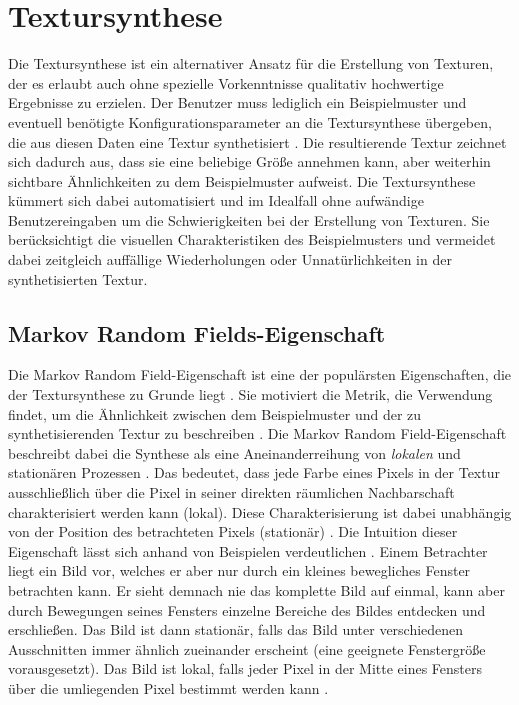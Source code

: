 \section{Textursynthese}

Die Textursynthese ist ein alternativer Ansatz für die Erstellung von Texturen, der es erlaubt auch ohne spezielle Vorkenntnisse qualitativ hochwertige Ergebnisse zu erzielen.
Der Benutzer muss lediglich ein Beispielmuster und eventuell benötigte Konfigurationsparameter an die Textursynthese übergeben, die aus diesen Daten eine Textur synthetisiert \cite{StateOfTheArt}.
Die resultierende Textur zeichnet sich dadurch aus, dass sie eine beliebige Größe annehmen kann, aber weiterhin sichtbare Ähnlichkeiten zu dem Beispielmuster aufweist.
Die Textursynthese kümmert sich dabei automatisiert und im Idealfall ohne aufwändige Benutzereingaben um die Schwierigkeiten bei der Erstellung von Texturen.
Sie berücksichtigt die visuellen Charakteristiken des Beispielmusters und vermeidet dabei zeitgleich auffällige Wiederholungen oder Unnatürlichkeiten in der synthetisierten Textur.

\subsection{\glqq Markov Random Fields\grqq -Eigenschaft}

Die \glqq Markov Random Field\grqq -Eigenschaft ist eine der populärsten Eigenschaften, die der Textursynthese zu Grunde liegt \cite{StateOfTheArt}.
Sie motiviert die Metrik, die Verwendung findet, um die Ähnlichkeit zwischen dem Beispielmuster und der zu synthetisierenden Textur zu beschreiben \cite{TexturOptimization}.
Die \glqq Markov Random Field\grqq -Eigenschaft beschreibt dabei die Synthese als eine Aneinanderreihung von \emph{lokalen} und {stationären} Prozessen \cite{StateOfTheArt}.
Das bedeutet, dass jede Farbe eines Pixels in der Textur ausschließlich über die Pixel in seiner direkten räumlichen Nachbarschaft charakterisiert werden kann (lokal).
Diese Charakterisierung ist dabei unabhängig von der Position des betrachteten Pixels (stationär) \cite{TexturOptimization}.
Die Intuition dieser Eigenschaft lässt sich anhand von Beispielen verdeutlichen .
Einem Betrachter liegt ein Bild vor, welches er aber nur durch ein kleines bewegliches Fenster betrachten kann.
Er sieht demnach nie das komplette Bild auf einmal, kann aber durch Bewegungen seines Fensters einzelne Bereiche des Bildes entdecken und erschließen.
Das Bild ist dann stationär, falls das Bild unter verschiedenen Ausschnitten immer ähnlich zueinander erscheint (eine geeignete Fenstergröße vorausgesetzt).
Das Bild ist lokal, falls jeder Pixel in der Mitte eines Fensters über die umliegenden Pixel bestimmt werden kann \cite{StateOfTheArt}.

